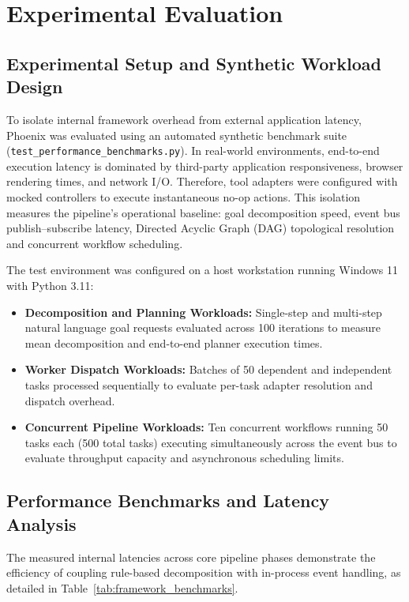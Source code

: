 \documentclass[conference]{IEEEtran}
\begin{document}
\section{Experimental Evaluation}
\subsection{Experimental Setup and Synthetic Workload Design}
To isolate internal framework overhead from external application latency, Phoenix was evaluated using an automated synthetic benchmark suite (\texttt{test\_performance\_benchmarks.py}). In real-world environments, end-to-end execution latency is dominated by third-party application responsiveness, browser rendering times, and network I/O. Therefore, tool adapters were configured with mocked controllers to execute instantaneous no-op actions. This isolation measures the pipeline's operational baseline: goal decomposition speed, event bus publish--subscribe latency, Directed Acyclic Graph (DAG) topological resolution and concurrent workflow scheduling.

The test environment was configured on a host workstation running Windows 11 with Python 3.11:
\begin{itemize}
    \item \textbf{Decomposition and Planning Workloads:} Single-step and multi-step natural language goal requests evaluated across 100 iterations to measure mean decomposition and end-to-end planner execution times.
    \item \textbf{Worker Dispatch Workloads:} Batches of 50 dependent and independent tasks processed sequentially to evaluate per-task adapter resolution and dispatch overhead.
    \item \textbf{Concurrent Pipeline Workloads:} Ten concurrent workflows running 50 tasks each (500 total tasks) executing simultaneously across the event bus to evaluate throughput capacity and asynchronous scheduling limits.
\end{itemize}

\subsection{Performance Benchmarks and Latency Analysis}
The measured internal latencies across core pipeline phases demonstrate the efficiency of coupling rule-based decomposition with in-process event handling, as detailed in Table~\ref{tab:framework_benchmarks}.
\end{document}
